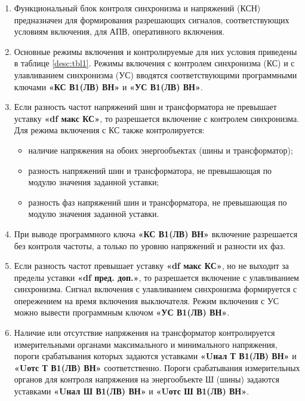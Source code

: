 \begin{enumerate}

\item
Функциональный блок контроля синхронизма и напряжений (КСН) предназначен для формирования разрешающих сигналов, соответствующих условиям включения, для АПВ, оперативного включения. 

\item
Основные режимы включения и контролируемые для них условия приведены в таблице \ref{desc:tbl1}. Режимы включения с контролем синхронизма (КС) и с улавливанием синхронизма (УС) вводятся соответствующими программными ключами \textbf{«КС В1(ЛВ) ВН»} и \textbf{«УС В1(ЛВ) ВН»}.

\item
Если разность частот напряжений шин и трансформатора не превышает уставку \textbf{«df макс КС»}, то разрешается включение с контролем синхронизма. Для режима включения с КС также контролируется:
\begin{itemize}
\item наличие напряжения на обоих энергообъектах (шины и трансформатор);
\item разность напряжений шин и трансформатора, не превышающая по модулю значения заданной уставки;
\item разность фаз напряжений шин и трансформатора, не превышающая по модулю значения заданной уставки.
\end{itemize}

\item
При выводе программного ключа \textbf{«КС В1(ЛВ) ВН»} включение разрешается без контроля частоты, а только по уровню напряжений и разности их фаз.

\item
Если разность частот превышает уставку \textbf{«df макс КС»}, но не выходит за пределы уставки \textbf{«df пред. доп.»}, то разрешается включение с улавливанием синхронизма. Сигнал включения с улавливанием синхронизма формируется с опережением на время включения выключателя. Режим включения с УС можно вывести программным ключом \textbf{«УС В1(ЛВ) ВН»}.

\item
Наличие или отсутствие напряжения на трансформатор контролируется измерительными органами максимального и минимального напряжения, пороги срабатывания которых задаются уставками \textbf{«Uнал Т В1(ЛВ) ВН»} и \textbf{«Uотс Т В1(ЛВ) ВН»} соответственно. Пороги срабатывания измерительных органов для контроля напряжения на энергообъекте Ш (шины) задаются уставками \textbf{«Uнал Ш В1(ЛВ) ВН»} и \textbf{«Uотс Ш В1(ЛВ) ВН»}.


\end{enumerate}

